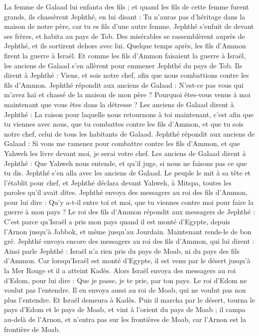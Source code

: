 \begin{multicols}{2}
La femme de Galaad lui enfanta des fils ; et quand les fils de cette femme furent grands, ils chassèrent Jephthé, en lui disant : Tu n'auras pas d'héritage dans la maison de notre père, car tu es fils d'une autre femme.
Jephthé s'enfuit de devant ses frères, et habita au pays de Tob. Des misérables se rassemblèrent auprès de Jephthé, et ils sortirent dehors avec lui.
Quelque temps après, les fils d'Ammon firent la guerre à Israël.
Et comme les fils d'Ammon faisaient la guerre à Israël, les anciens de Galaad s'en allèrent pour emmener Jephthé du pays de Tob.
Ils dirent à Jephthé : Viens, et sois notre chef, afin que nous combattions contre les fils d'Ammon.
Jephthé répondit aux anciens de Galaad : N'est-ce pas vous qui m'avez haï et chassé de la maison de mon père ? Pourquoi êtes-vous venus à moi maintenant que vous êtes dans la détresse ?
Les anciens de Galaad dirent à Jephthé : La raison pour laquelle nous retournons à toi maintenant, c'est afin que tu viennes avec nous, que tu combattes contre les fils d'Ammon, et que tu sois notre chef, celui de tous les habitants de Galaad.
Jephthé répondit aux anciens de Galaad : Si vous me ramenez pour combattre contre les fils d'Ammon, et que Yahweh les livre devant moi, je serai votre chef.
Les anciens de Galaad dirent à Jephthé : Que Yahweh nous entende, et qu'il juge, si nous ne faisons pas ce que tu dis.
Jephthé s'en alla avec les anciens de Galaad. Le peuple le mit à sa tête et l'établit pour chef, et Jephthé déclara devant Yahweh, à Mitspa, toutes les paroles qu'il avait dites.
Jephthé envoya des messagers au roi des fils d'Ammon, pour lui dire : Qu'y a-t-il entre toi et moi, que tu viennes contre moi pour faire la guerre à mon pays ?
Le roi des fils d'Ammon répondit aux messagers de Jephthé : C'est parce qu'Israël a pris mon pays quand il est monté d'Egypte, depuis l'Arnon jusqu'à Jabbok, et même jusqu'au Jourdain. Maintenant rends-le de bon gré.
Jephthé envoya encore des messagers au roi des fils d'Ammon,
qui lui dirent : Ainsi parle Jephthé : Israël n'a rien pris du pays de Moab, ni du pays des fils d'Ammon.
Car lorsqu’Israël est monté d'Egypte, il est venu par le désert jusqu'à la Mer Rouge et il a atteint Kadès.
Alors Israël envoya des messagers au roi d'Edom, pour lui dire : Que je passe, je te prie, par ton pays. Le roi d'Edom ne voulut pas l'entendre. Il en envoya aussi au roi de Moab, qui ne voulut pas non plus l'entendre. Et Israël demeura à Kadès.
Puis il marcha par le désert, tourna le pays d'Edom et le pays de Moab, et vint à l'orient du pays de Moab ; il campa au-delà de l'Arnon, et n'entra pas sur les frontières de Moab, car l'Arnon est la frontière de Moab.

\end{multicols}

